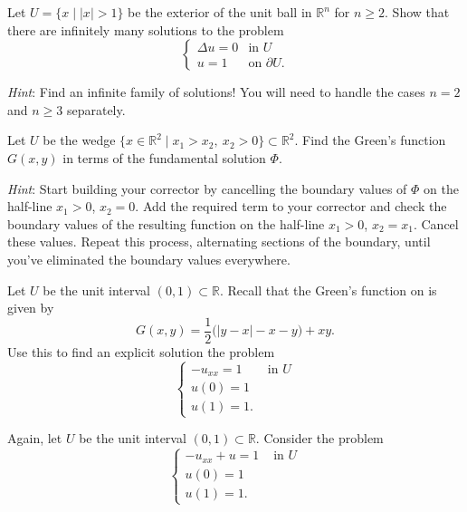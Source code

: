 \documentclass[12pt,fleqn]{exam}
\newcommand{\R}{\ensuremath{\mathbb{R}}}
\begin{document}
\begin{questions}

\question Let $U = \{x \mid |x| > 1\}$ be the exterior of the unit ball in $\R^n$ for $n \geq 2$. Show that there are infinitely many solutions to the problem
\[\begin{cases}
\Delta u = 0 & \text{in } U \\
u = 1 & \text{on } \partial U .
\end{cases}\]

\emph{Hint}: Find an infinite family of solutions! You will need to handle the cases $n = 2$ and $n \geq 3$ separately.

\question Let $U$ be the wedge $\{x \in \mathbb{R}^2 \mid x_1 > x_2,\ x_2 > 0\} \subset \R^2$. Find the Green's function $G(x,y)$ in terms of the fundamental solution $\Phi$.

\vspace{1ex}\emph{Hint}: Start building your corrector by cancelling the boundary values of $\Phi$ on the half-line $x_1 > 0$, $x_2 = 0$. Add the required term to your corrector and check the boundary values of the resulting function on the half-line $x_1 > 0$, $x_2 = x_1$. Cancel these values. Repeat this process, alternating sections of the boundary, until you've eliminated the boundary values everywhere.

\question Let $U$ be the unit interval $(0,1) \subset \R$. Recall that the Green's function on is given by
\[G(x,y) = \frac12 \big(|y-x|-x-y\big) + xy.\]
Use this to find an explicit solution the problem
\[
\begin{cases}
-u_{xx} = 1 & \text{ in $U$} \\
u(0) = 1 \\
u(1) = 1.
\end{cases}
\]

\question Again, let $U$ be the unit interval $(0,1) \subset \R$. Consider the problem
\[
\begin{cases}
-u_{xx} + u = 1 & \text{ in $U$} \\
u(0) = 1 \\
u(1) = 1.
\end{cases}
\]



\end{questions}
\end{document}
